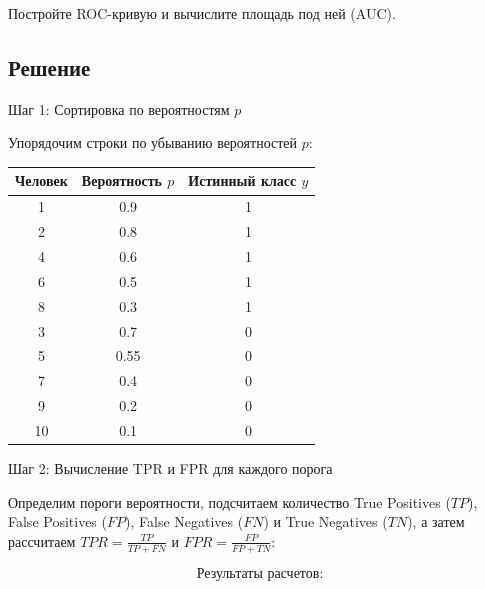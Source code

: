 Постройте ROC-кривую и вычислите площадь под ней (AUC).

\subsection*{Решение}

Шаг 1: Сортировка по вероятностям $p$

Упорядочим строки по убыванию вероятностей $p$:

\begin{table}[h!]
    \centering
    \begin{tabular}{|c|c|c|}
        \hline
        \textbf{Человек} & \textbf{Вероятность $p$} & \textbf{Истинный класс $y$} \\
        \hline
        1                & 0.9                      & 1                           \\
        2                & 0.8                      & 1                           \\
        4                & 0.6                      & 1                           \\
        6                & 0.5                      & 1                           \\
        8                & 0.3                      & 1                           \\
        3                & 0.7                      & 0                           \\
        5                & 0.55                     & 0                           \\
        7                & 0.4                      & 0                           \\
        9                & 0.2                      & 0                           \\
        10               & 0.1                      & 0                           \\
        \hline
    \end{tabular}
\end{table}

Шаг 2: Вычисление TPR и FPR для каждого порога

Определим пороги вероятности, подсчитаем количество True Positives ($TP$), False Positives ($FP$), False Negatives ($FN$) и True Negatives ($TN$), а затем рассчитаем $TPR = \frac{TP}{TP + FN}$ и $FPR = \frac{FP}{FP + TN}$:

\[
    \text{Результаты расчетов:}
\]

